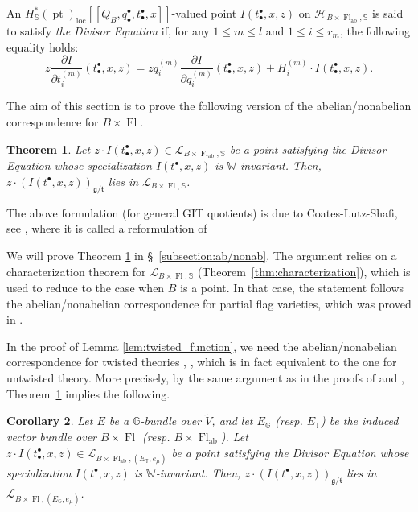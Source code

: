 \documentclass[a4paper,12pt]{amsart}
\numberwithin{equation}{section}
\newtheorem{theorem}{Theorem}[section]
\newtheorem{corollary}[theorem]{Corollary}
\theoremstyle{definition}
\newcommand{\G}{\mathbb{G}}
\newcommand{\bbS}{\mathbb{S}}
\newcommand{\T}{\mathbb{T}}
\newcommand{\W}{\mathbb{W}}
\newcommand{\cH}{\mathcal{H}}
\newcommand{\cL}{\mathcal{L}}
\newcommand{\gt}{{\mathfrak{g}/\mathfrak{t}}}
\newcommand{\loc}{{\operatorname{loc}}}
\newcommand{\pt}{\operatorname{pt}}
\newcommand{\Fl}{\operatorname{Fl}}
\newcommand{\FlG}{\operatorname{Fl}}
\newcommand{\FlT}{\operatorname{Fl}_{\operatorname{ab}}}
\def\parfrac#1#2{\frac{\partial #1}{\partial #2}}
\begin{document}
An $H^*_\bbS(\pt)_\loc[\![Q_B,q_\bullet^\bullet,t_\bullet^\bullet,x]\!]$-valued point $I(t_\bullet^\bullet,x,z)$ on $\cH_{B\times\FlT,\bbS}$ is said to satisfy \emph{the Divisor Equation} \cite{CLS} if, for any $1\leq m\leq l$ and $1\leq i\leq r_m$, the following equality holds:
\begin{equation}\label{eqn:Divisor_Equation}
    z\parfrac{I}{t_i^{(m)}}(t_\bullet^\bullet,x,z) = zq_i^{(m)}\parfrac{I}{q_i^{(m)}}(t_\bullet^\bullet,x,z) + H_i^{(m)}\cdot I(t_\bullet^\bullet,x,z).
\end{equation}

The aim of this section is to prove the following version of the abelian/nonabelian correspondence for $B\times\Fl$.

\begin{theorem}\label{thm:abelian/nonabelian_correspondence}
    Let $z\cdot I(t^\bullet_\bullet,x,z) \in \cL_{B\times\FlT,\bbS}$ be a point satisfying the Divisor Equation whose specialization $I(t^\bullet,x,z)$ is $\W$-invariant.
    Then, $z \cdot (I(t^\bullet,x,z))_\gt$ lies in $\cL_{B\times\Fl,\bbS}$.
\end{theorem}


The above formulation (for general GIT quotients) is due to Coates-Lutz-Shafi, see \cite[Conjecture 1.8]{CLS}, where it is called a reformulation of \cite[Conjecture 3.7.1]{CFKS}

We will prove Theorem \ref{thm:abelian/nonabelian_correspondence} in \S~\ref{subsection:ab/nonab}.
The argument relies on a characterization theorem for $\cL_{B\times\Fl,\bbS}$ (Theorem~\ref{thm:characterization}), which is used to reduce to the case when $B$ is a point. In that case, the statement follows the abelian/nonabelian correspondence for partial flag varieties, which was proved in \cite[Theorem 4.1.1]{CFKS}.

In the proof of Lemma \ref{lem:twisted_function}, we need the abelian/nonabelian correspondence for twisted theories \cite[Conjecture 6.1.1]{CFKS}, \cite[Conjecture 1.9]{CLS}, which is in fact equivalent to the one for untwisted theory. 
More precisely, by the same argument as in the proofs of \cite[Theorem 6.1.2]{CFKS} and \cite[Proposition 1.7]{CLS}, Theorem~\ref{thm:abelian/nonabelian_correspondence} implies the following.

\begin{corollary}\label{cor:twisted_abelian_nonabelian_correspondence}
    Let $E$ be a $\G$-bundle over $\widetilde{V}$, and let $E_\G$ (resp. $E_\T$) be the induced vector bundle over $B\times\FlG$ (resp. $B\times\FlT$).
    Let $z\cdot I(t^\bullet_\bullet,x,z) \in \cL_{B\times\FlT,(E_\T,e_\mu)}$ be a point satisfying the Divisor Equation whose specialization $I(t^\bullet,x,z)$ is $\W$-invariant.
    Then, $z \cdot (I(t^\bullet,x,z))_\gt$ lies in $\cL_{B\times\Fl,(E_\G,e_\mu)}$.
\end{corollary}
\end{document}
